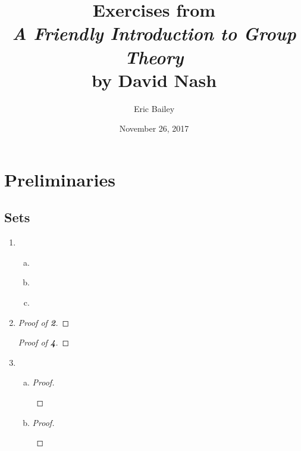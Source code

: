 \documentclass[12pt]{amsart}
\title[A Friendly Introduction to Group Theory]{%
  Exercises from \\
  {\sl A Friendly Introduction to Group Theory} \\
  by David Nash%
}
\author{Eric Bailey}
\date{November 26, 2017}
\def\Circled#1{{\Large \textcircled{\small \bf #1}}}
\def\exercise#1#2{%
  \inputminted{gap}{gap/#1/#2.g}%
  \inputminted{gap}{answer/#1/#2.txt}%
}
\def\inputproof#1#2{%
  \begin{proof}[Proof of \Circled{#2}]
    
  \end{proof}%
}
\begin{document}
\maketitle
\tableofcontents
\newpage

\section{Preliminaries}

\subsection{Sets}

\begin{enumerate}[{\bf 1.}]
\item
  \begin{enumerate}[(a)]
  \item \exercise{1.1}{1a} \newpage
  \item \exercise{1.1}{1b}
  \item \exercise{1.1}{1c}
  \end{enumerate} \newpage

\item
  \begin{sideways}
    \begin{minipage}{\textheight}
      \inputproof{1.1}{2}
      \inputproof{1.1}{4}
    \end{minipage}
  \end{sideways}
\item
  \begin{enumerate}[(a)]
  \item
    \begin{proof}
      \begin{prooftree*}


      \end{prooftree*}
    \end{proof}
  \item
    \begin{proof}
      \begin{prooftree*}


\end{prooftree*}
\end{proof}
\end{enumerate}
\end{enumerate}
\end{document}
